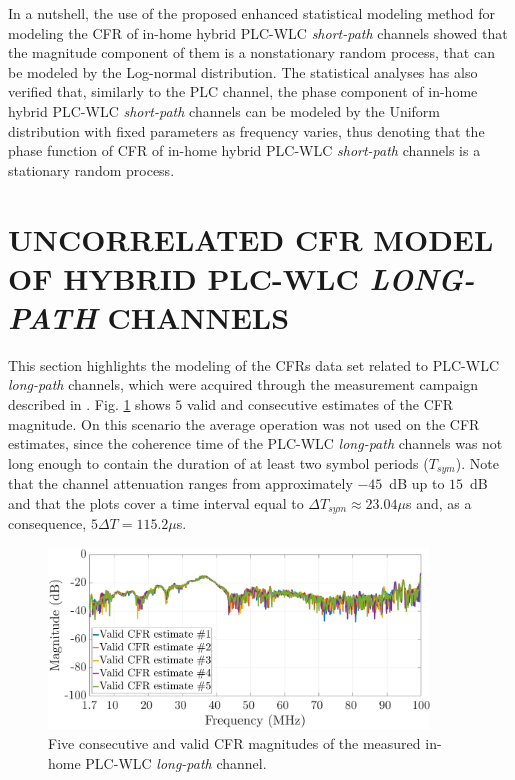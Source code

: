 In a nutshell, the use of the proposed enhanced statistical modeling method for modeling the \ac{CFR} of in-home hybrid \ac{PLC}-\ac{WLC} \textit{short-path} channels showed that the magnitude component of them is a nonstationary random process, that can be modeled by the Log-normal distribution. The statistical analyses has also verified that, similarly to the \ac{PLC} channel, the phase component of in-home hybrid \ac{PLC}-\ac{WLC} \textit{short-path} channels can be modeled by the Uniform distribution with fixed parameters as frequency varies, thus denoting that the phase function of \ac{CFR} of in-home hybrid \ac{PLC}-\ac{WLC} \textit{short-path} channels is a stationary random process.

\section{UNCORRELATED CFR MODEL OF HYBRID PLC-WLC \textit{LONG-PATH} CHANNELS} \label{sec:NR4}

This section highlights the modeling of the \acp{CFR} data set related to \ac{PLC}-\ac{WLC} \textit{long-path} channels, which were acquired through the measurement campaign described in \cite{thiago:hyb}. Fig. \ref{respfreqlW} shows $5$ valid and consecutive estimates of the \ac{CFR} magnitude. On this scenario the average operation was not used on the \ac{CFR} estimates, since the coherence time of the \ac{PLC}-\ac{WLC} \textit{long-path} channels was not long enough to contain the duration of at least two symbol periods ($T_{sym}$). Note that the channel attenuation ranges from approximately $-45$~dB up to $15$~dB and that the plots cover a time interval equal to $\Delta T_{sym}\approx23.04\mu$s and, as a consequence, $5\Delta T = 115.2\mu$s.

\begin{figure}[h]
	\centering
	\includegraphics[width=0.9\textwidth]{images/respfreqlW.eps}
	\caption{Five consecutive and valid CFR magnitudes of the measured in-home PLC-WLC \textit{long-path} channel.}
	\label{respfreqlW}
\end{figure}

